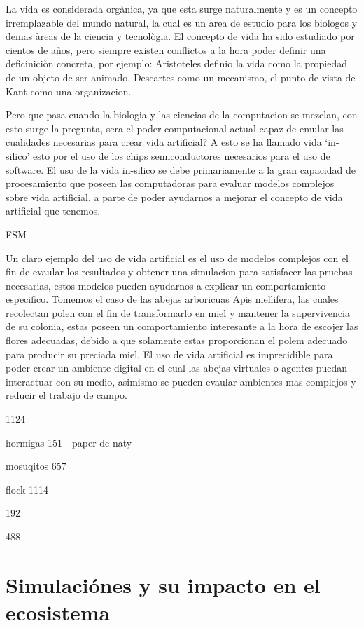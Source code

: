 \documentclass[conference]{IEEEtran}
\begin{document}
La vida es considerada org\`anica, ya que esta surge naturalmente y es un concepto irremplazable del mundo natural, la cual es un \’area de estudio para los bi\’ologos y dem\’as \`areas de la ciencia y tecnol\`ogia. El concepto de vida ha sido estudiado por cientos de a\~nos, pero siempre existen conflictos a la hora poder definir una deficinici\`on concreta, por ejemplo: Arist\’oteles defini\’o la vida como la propiedad de un objeto de ser animado, Descartes como un mecanismo, el punto de vista de Kant como una organizaci\’on. \cite{lifeStanfordPhi} 

Pero que pasa cuando la bi\’ologia y las ciencias de la computaci\’on se mezclan, con esto surge la pregunta, ser\’a el poder computacional actual capaz de emular las cualidades necesarias para crear vida artificial? A esto se ha llamado vida `in-silico' \cite{artificiallifeLevy, lifeStanfordPhi} esto por el uso de los chips semiconductores necesarios para el uso de software. El uso de la vida in-silico se debe primariamente a la gran capacidad de procesamiento que poseen las computadoras para evaluar modelos complejos sobre vida artificial, a parte de poder ayudarnos a mejorar el concepto de vida artificial que tenemos. 

FSM

Un claro ejemplo del uso de vida artificial es el uso de modelos complejos con el fin de evaular los resultados y obtener una simulacion para satisfacer las pruebas necesarias, estos modelos pueden ayudarnos a explicar un comportamiento especifico. Tomemos el caso de las abejas arboricuas Apis mellifera, las cuales recolectan polen con el fin de transformarlo en miel y mantener la supervivencia de su colonia, estas poseen un comportamiento interesante a la hora de escojer las flores adecuadas, debido a que solamente estas proporcionan el polem adecuado para producir su preciada miel. \cite{ZOE01} El uso de vida artificial es imprecidible para poder crear un ambiente digital en el cual las abejas virtuales o agentes puedan interactuar con su medio, asimismo se pueden evaular ambientes mas complejos y reducir el trabajo de campo. 

1124

hormigas 151 - paper de naty

mosuqitos 657

flock 1114

192

488




\section{Simulaci\'ones y su impacto en el ecosistema}
\end{document}
